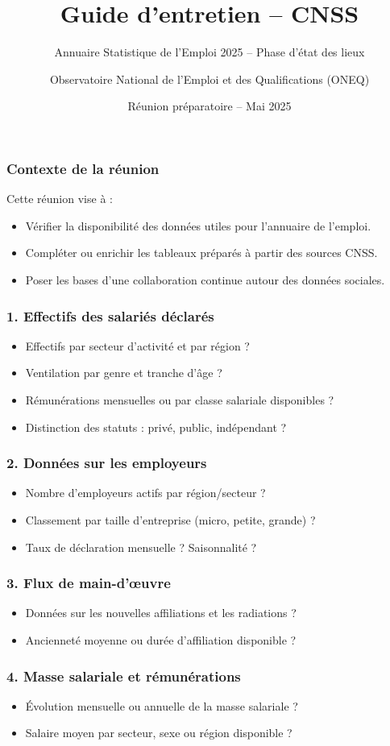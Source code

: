 \documentclass{beamer}
\title{Guide d’entretien – CNSS}
\subtitle{Annuaire Statistique de l’Emploi 2025 – Phase d’état des lieux}
\author{Observatoire National de l’Emploi et des Qualifications (ONEQ)}
\date{Réunion préparatoire – Mai 2025}
\begin{document}
\frame{\titlepage}

\begin{frame}
\frametitle{Contexte de la réunion}
Cette réunion vise à :
\begin{itemize}
  \item Vérifier la disponibilité des données utiles pour l’annuaire de l’emploi.
  \item Compléter ou enrichir les tableaux préparés à partir des sources CNSS.
  \item Poser les bases d’une collaboration continue autour des données sociales.
\end{itemize}
\end{frame}

\begin{frame}
\frametitle{1. Effectifs des salariés déclarés}
\begin{itemize}
  \item Effectifs par secteur d’activité et par région ?
  \item Ventilation par genre et tranche d’âge ?
  \item Rémunérations mensuelles ou par classe salariale disponibles ?
  \item Distinction des statuts : privé, public, indépendant ?
\end{itemize}
\end{frame}

\begin{frame}
\frametitle{2. Données sur les employeurs}
\begin{itemize}
  \item Nombre d’employeurs actifs par région/secteur ?
  \item Classement par taille d’entreprise (micro, petite, grande) ?
  \item Taux de déclaration mensuelle ? Saisonnalité ?
\end{itemize}
\end{frame}

\begin{frame}
\frametitle{3. Flux de main-d’œuvre}
\begin{itemize}
  \item Données sur les nouvelles affiliations et les radiations ?
  \item Ancienneté moyenne ou durée d’affiliation disponible ?
\end{itemize}
\end{frame}

\begin{frame}
\frametitle{4. Masse salariale et rémunérations}
\begin{itemize}
  \item Évolution mensuelle ou annuelle de la masse salariale ?
  \item Salaire moyen par secteur, sexe ou région disponible ?
\end{itemize}
\end{frame}
\end{document}
